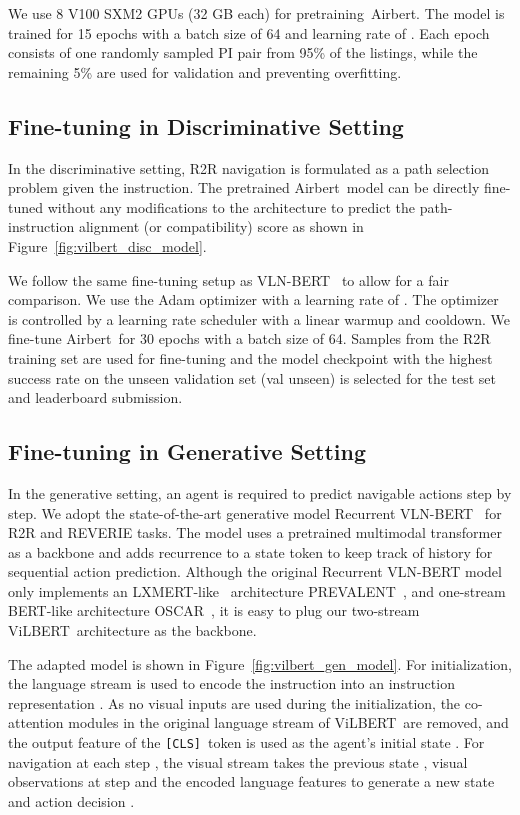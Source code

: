 \RequirePackage[dvipsnames,table]{xcolor} \documentclass[10pt,twocolumn,letterpaper]{article}
\newcommand{\vilbert}{ViLBERT}
\newcommand{\vlnbert}{VLN-BERT}
\newcommand{\airbert}{Airbert}
\newcommand{\cls}{\texttt{[CLS]}}
\begin{document}
We use 8 V100 SXM2 GPUs (32 GB each) for pretraining~\airbert.
The model is trained for 15 epochs with a batch size of 64 and learning rate of .
Each epoch consists of one randomly sampled PI pair from 95\% of the listings, while the remaining 5\% are used for validation and preventing overfitting.


\subsection{Fine-tuning in Discriminative Setting}
In the discriminative setting, R2R navigation is formulated as a path selection problem given the instruction.
The pretrained \airbert~model can be directly fine-tuned without any modifications to the architecture to predict the path-instruction alignment (or compatibility) score as shown in Figure~\ref{fig:vilbert_disc_model}.

We follow the same fine-tuning setup as \vlnbert~\cite{majumdar2020vlnbert} to allow for a fair comparison.
We use the Adam optimizer with a learning rate of .
The optimizer is controlled by a learning rate scheduler with a linear warmup and cooldown. 
We fine-tune \airbert~for 30 epochs with a batch size of 64.
Samples from the R2R training set are used for fine-tuning and the model checkpoint with the highest success rate on the unseen validation set (val unseen) is selected for the test set and leaderboard submission.



\subsection{Fine-tuning in Generative Setting}
In the generative setting, an agent is required to predict navigable actions step by step.
We adopt the state-of-the-art generative model Recurrent VLN-BERT~\cite{hong2021recurrentvln} for R2R and REVERIE tasks.
The model uses a pretrained multimodal transformer as a backbone and adds recurrence to a state token to keep track of history for sequential action prediction.
Although the original Recurrent VLN-BERT model only implements an LXMERT-like~\cite{tan2019lxmert} architecture PREVALENT~\cite{hao2020prevalent}, and one-stream BERT-like architecture OSCAR~\cite{li2020oscar}, it is easy to plug our two-stream \vilbert~architecture as the backbone.

The adapted model is shown in Figure~\ref{fig:vilbert_gen_model}.
For initialization, the language stream is used to encode the instruction  into an instruction representation .
As no visual inputs are used during the initialization, the co-attention modules in the original language stream of \vilbert~are removed, and the output feature of the \cls~token is used as the agent's initial state .
For navigation at each step , the visual stream takes the previous state , visual observations  at step  and the encoded language features  to generate a new state  and action decision .
\end{document}
